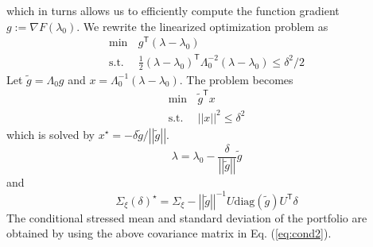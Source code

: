 \documentclass[letter, 12pt]{article}
\newcommand{\transpose}{^\mathsf{T}}
\newcommand{\trace}[1]{{\text{tr}}\left( #1 \right)}
\newcommand{\suchthat}{\text{s.t.}}
\newcommand{\norm}[1]{\left|\left|#1 \right|\right|}
\newcommand{\diag}[1]{\text{diag} \left(#1 \right)}
\newcommand{\inv}{^{-1}}
\begin{document}
which in turns allows us to efficiently compute the function gradient $g:=\nabla F(\lambda_0)$.
We rewrite the linearized optimization problem as
\begin{align*}
\min\, & g\transpose(\lambda-\lambda_0)\\
	\suchthat\, & \frac{1}{2}(\lambda-\lambda_0)\transpose \Lambda_0^{-2}(\lambda-\lambda_0) \le \delta^2/2 
\end{align*}
Let $\tilde g=\Lambda_0 g$ and $x=\Lambda_0\inv(\lambda-\lambda_0)$. The problem becomes
\begin{align*}
\min\, & \tilde g\transpose x\\
	\suchthat\, &  \norm{x}^2 \le \delta^2 
\end{align*}
which is solved by  $x^\star=-\delta\tilde g/\norm{\tilde g}$.
\[
\lambda=\lambda_0- \frac{\delta}{\norm{\tilde g} }\tilde g
\]
and
\[
\Sigma_\xi(\delta)^\star =\Sigma_\xi- \norm{\tilde g}\inv  U \diag{\tilde g} U\transpose \delta
\]
The conditional stressed mean and standard deviation of the portfolio are obtained by using the above covariance matrix in Eq. (\ref{eq:cond2}).
%
%
\end{document}
